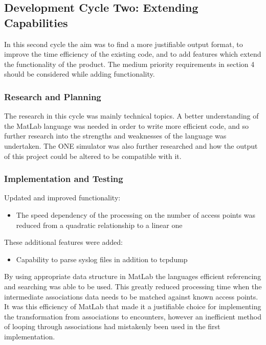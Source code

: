 \subsection{Development Cycle Two: Extending Capabilities}
In this second cycle the aim was to find a more justifiable output format, to improve the time efficiency of the existing code, and to add features which extend the functionality of the product. The medium priority requirements in section 4 should be considered while adding functionality.
    \subsubsection{Research and Planning}
    The research in this cycle was mainly technical topics. A better understanding of the MatLab language was needed in order to write more efficient code, and so further research into the strengths and weaknesses of the language was undertaken. The ONE simulator was also further researched and how the output of this project could be altered to be compatible with it.
    \subsubsection{Implementation and Testing}
    Updated and improved functionality:
    \begin{itemize}
        \item The speed dependency of the processing on the number of access points was reduced from a quadratic relationship to a linear one
    \end{itemize}
    These additional features were added:
    \begin{itemize}
        \item Capability to parse syslog files in addition to tcpdump
    \end{itemize}
    By using appropriate data structure in MatLab the languages efficient referencing and searching was able to be used. This greatly reduced processing time when the intermediate associations data needs to be matched against known access points. It was this efficiency of MatLab that made it a justifiable choice for implementing the transformation from associations to encounters, however an inefficient method of looping through associations had mistakenly been used in the first implementation.
